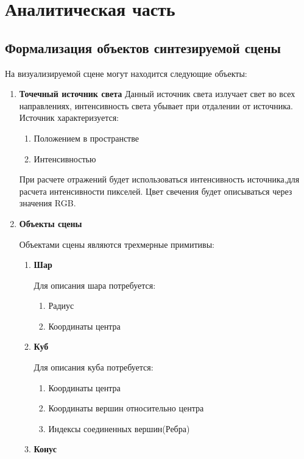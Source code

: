 
\chapter{Аналитическая часть}
\section[Формализация объектов синтезируемой сцены]{Формализация объектов синтезируемой сцены}
\label{sec:obj_formalasation}
На визуализируемой сцене могут находится следующие объекты:
\begin{enumerate}
	\item \textbf{Точечный источник света}
	Данный источник света излучает свет во всех направлениях, интенсивность света убывает при отдалении от источника.
	Источник характеризуется:
	\begin{enumerate}[label*=\arabic*.]
		\item Положением в пространстве
		\item Интенсивностью
	\end{enumerate}
	При расчете отражений будет использоваться интенсивность источника,для расчета интенсивности пикселей. Цвет свечения будет описываться через значения RGB.
	\item \textbf{Объекты сцены}
	
	Объектами сцены являются трехмерные примитивы:
	\begin{enumerate}[label*=\arabic*.]
		\item \textbf{Шар}
		
		Для описания шара потребуется:
		\begin{enumerate}[label*=\arabic*.]
			\item Радиус
			\item Координаты центра
		\end{enumerate}
		\item  \textbf{Куб}
		
		Для описания куба потребуется:
		\begin{enumerate}[label*=\arabic*.]
			\item Координаты центра
			\item Координаты вершин относительно центра
			\item Индексы соединенных вершин(Ребра)
		\end{enumerate}
		\item  \textbf{Конус}
		

\end{enumerate}
\end{enumerate}
